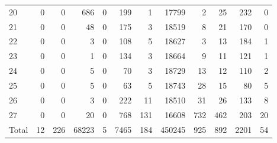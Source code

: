 \begin{table}
\begin{tabular}{lrrrrrrrrrrr}
20 & 0 & 0 & 686 & 0 & 199 & 1 & 17799 & 2 & 25 & 232 & 0 \\
21 & 0 & 0 & 48 & 0 & 175 & 3 & 18519 & 8 & 21 & 170 & 0 \\
22 & 0 & 0 & 3 & 0 & 108 & 5 & 18627 & 3 & 13 & 184 & 1 \\
23 & 0 & 0 & 1 & 0 & 134 & 3 & 18664 & 9 & 11 & 121 & 1 \\
24 & 0 & 0 & 5 & 0 & 70 & 3 & 18729 & 13 & 12 & 110 & 2 \\
25 & 0 & 0 & 5 & 0 & 63 & 5 & 18743 & 28 & 15 & 80 & 5 \\
26 & 0 & 0 & 3 & 0 & 222 & 11 & 18510 & 31 & 26 & 133 & 8 \\
27 & 0 & 0 & 20 & 0 & 768 & 131 & 16608 & 732 & 462 & 203 & 20 \\
Total & 12 & 226 & 68223 & 5 & 7465 & 184 & 450245 & 925 & 892 & 2201 & 54 \\
\end{tabular}
\end{table}
